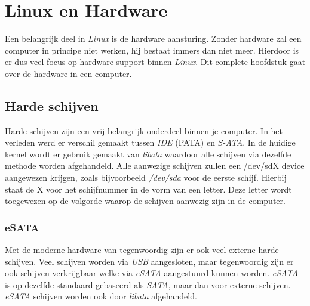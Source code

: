 %
%
%
%

\chapter{Linux en Hardware}
Een belangrijk deel in \emph{Linux} is de hardware aansturing. Zonder hardware zal een computer in principe niet werken, hij bestaat immers dan niet meer. Hierdoor is er dus veel focus op hardware support binnen \emph{Linux}. Dit complete hoofdstuk gaat over de hardware in een computer.

\section{Harde schijven}
Harde schijven zijn een vrij belangrijk onderdeel binnen je computer. In het verleden werd er verschil gemaakt tussen \emph{IDE} (PATA) en \emph{S-ATA}. In de huidige kernel wordt er gebruik gemaakt van \emph{libata} waardoor alle schijven via dezelfde methode worden afgehandeld. Alle aanwezige schijven zullen een /dev/sdX device aangewezen krijgen, zoals bijvoorbeeld \emph{/dev/sda} voor de eerste schijf. Hierbij staat de X voor het schijfnummer in de vorm van een letter. Deze letter wordt toegewezen op de volgorde waarop  de schijven aanwezig zijn in de computer.

\subsection{eSATA}
Met de moderne hardware van tegenwoordig zijn er ook veel externe harde schijven. Veel schijven worden via \emph{USB} aangesloten, maar tegenwoordig zijn er ook schijven verkrijgbaar welke via \emph{eSATA} aangestuurd kunnen worden. \emph{eSATA} is op dezelfde standaard gebaseerd als \emph{SATA}, maar dan voor externe schijven. \emph{eSATA} schijven worden ook door \emph{libata} afgehandeld.

